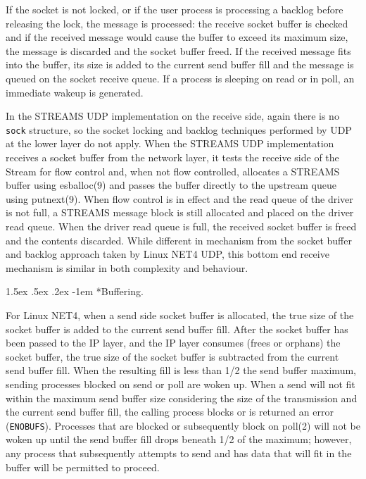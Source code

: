 \documentclass[letterpaper,final,notitlepage,twocolumn,10pt,twoside]{article}
\makeatletter
\renewcommand\paragraph{\@startsection{paragraph}{4}{\z@}%
                                    {1.5ex \@plus .5ex \@minus .2ex}%
                                    {-1em}%
                                    {\normalfont\normalsize\bfseries\slshape}}
\makeatother
\begin{document}
If the socket is not locked, or if the user process is processing a backlog
before releasing the lock, the message is processed: the receive socket buffer
is checked and if the received message would cause the buffer to exceed its
maximum size, the message is discarded and the socket buffer freed.  If the
received message fits into the buffer, its size is added to the current send
buffer fill and the message is queued on the socket receive queue.  If a
process is sleeping on read or in poll, an immediate wakeup is generated.

In the STREAMS UDP implementation on the receive side, again there is no
\texttt{sock} structure, so the socket locking and backlog techniques
performed by UDP at the lower layer do not apply.  When the STREAMS UDP
implementation receives a socket buffer from the network layer, it tests the
receive side of the Stream for flow control and, when not flow controlled,
allocates a STREAMS buffer using esballoc(9) and passes the buffer directly to
the upstream queue using putnext(9).  When flow control is in effect and the
read queue of the driver is not full, a STREAMS message block is still
allocated and placed on the driver read queue.  When the driver read queue is
full, the received socket buffer is freed and the contents discarded.  While
different in mechanism from the socket buffer and backlog approach taken by
Linux NET4 UDP, this bottom end receive mechanism is similar in both
complexity and behaviour.

\paragraph*{Buffering.}

For Linux NET4, when a send side socket buffer is allocated, the true size of
the socket buffer is added to the current send buffer fill.  After the socket
buffer has been passed to the IP layer, and the IP layer consumes (frees or
orphans) the socket buffer, the true size of the socket buffer is subtracted
from the current send buffer fill.  When the resulting fill is less than 1/2
the send buffer maximum, sending processes blocked on send or poll are woken
up.  When a send will not fit within the maximum send buffer size considering
the size of the transmission and the current send buffer fill, the calling
process blocks or is returned an error (\texttt{ENOBUFS}).  Processes that are
blocked or subsequently block on poll(2) will not be woken up until the send
buffer fill drops beneath 1/2 of the maximum; however, any process that
subsequently attempts to send and has data that will fit in the buffer will be
permitted to proceed.
\end{document}
